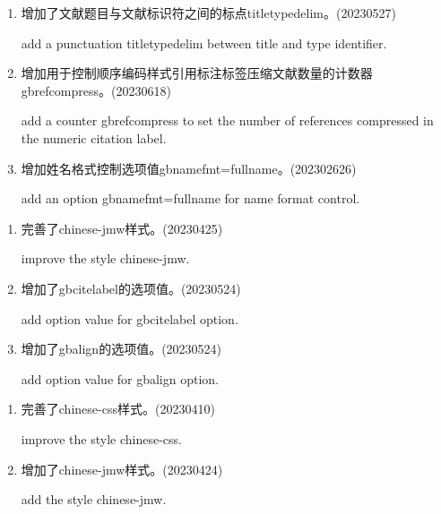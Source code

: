 \label{up:20230910}
\begin{enumerate}

\item 增加了文献题目与文献标识符之间的标点titletypedelim。(20230527)

add a punctuation titletypedelim between title and type identifier.

\item 增加用于控制顺序编码样式引用标注标签压缩文献数量的计数器gbrefcompress。(20230618)

add a counter gbrefcompress to set the number of references compressed in the numeric citation label.

\item 增加姓名格式控制选项值gbnamefmt=fullname。(202302626)

add an option gbnamefmt=fullname for name format control.


\end{enumerate}


\label{up:20230524}
\begin{enumerate}

\item 完善了chinese-jmw样式。(20230425)

improve the style chinese-jmw.

\item 增加了gbcitelabel的选项值。(20230524)

add option value for gbcitelabel option.


\item 增加了gbalign的选项值。(20230524)

add option value for gbalign option.

\end{enumerate}


\label{up:20230424}
\begin{enumerate}

\item 完善了chinese-css样式。(20230410)

improve the style chinese-css.

\item 增加了chinese-jmw样式。(20230424)

add the style chinese-jmw.

\end{enumerate}

